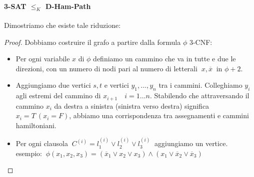 \documentclass[a4paper]{article}
\theoremstyle{definition}
\begin{document}
			\paragraph{3-SAT $ \leq_K $ D-Ham-Path} Dimostriamo che esiste tale riduzione:
			\begin{proof}
				Dobbiamo costruire il grafo a partire dalla formula $ \phi $ 3-CNF:
				\begin{itemize}
					\item Per ogni variabile $ x $ di $ \phi $ definiamo un cammino che va in tutte e due le direzioni, con un numero di nodi pari al numero di letterali $ \ x, \overline{x}\ $ in $ \phi + 2 $.
					\item Aggiungiamo due vertici $ s, t $ e vertici $ y_1, \dots, y_n $ tra i cammini. Colleghiamo $ y_i $ agli estremi del cammino di $ x_{i+1} \quad i = 1\dots n $. Stabilendo che attraversando il cammino $ x_i $ da destra a sinistra (sinistra verso destra) significa $ x_i = T \ (x_i = F) $, abbiamo una corrispondenza tra assegnamenti e cammini hamiltoniani. 
					\item Per ogni clausola $ \ C^{(i)} = l^{(i)}_1 \vee l^{(i)}_2 \vee l^{(i)}_3 \ $ aggiungiamo un vertice.\\
					esempio: $ \ \phi(x_1, x_2, x_3) = (\overline{x}_1\vee x_2\vee x_3)\wedge(x_1\vee \overline{x}_2\vee \overline{x}_3) $
					

\end{itemize}
\end{proof}
\end{document}
